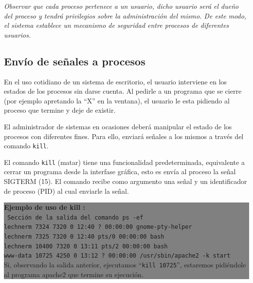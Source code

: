 \documentclass[12pt]{article}
\begin{document}
\textit{Observar que cada proceso pertenece a un usuario, dicho usuario será el 
dueño del proceso y tendrá privilegios sobre la administración del mismo. De 
este modo, el sistema establece un mecanismo de seguridad entre procesos de
diferentes usuarios.}

\subsection*{Envío de señales a procesos}

En el uso cotidiano de un sistema de escritorio, el usuario interviene 
en los estados de los procesos sin darse cuenta. Al pedirle a un programa
que se cierre (por ejemplo apretando la ``X'' en la ventana), el usuario
le esta pidiendo al proceso que termine y deje de existir. 

El administrador de sistemas en ocasiones deberá manipular el estado de 
los procesos con diferentes fines. Para ello, enviará señales a los 
mismos a través del comando \texttt{kill}. 


El comando \texttt{kill} (matar) tiene una funcionalidad predeterminada, 
equivalente a cerrar un programa desde la interfase gráfica, esto es envía
al proceso la señal SIGTERM (15). El comando 
recibe como argumento una señal y un identificador de proceso (PID) al 
cual enviarle la señal. 

\colorbox{grey}{\parbox[t]{0.95\linewidth}{ \vspace*{0.5cm} { 
{\bf Ejemplo de uso de kill :} \\
{\tt
Sección de la salida del comando \texttt{ps -ef}\\
lechnerm  7324  7320  0 12:40 ?        00:00:00 gnome-pty-helper \\
lechnerm  7325  7320  0 12:40 pts/0    00:00:00 bash\\
lechnerm 10400  7320  0 13:11 pts/2    00:00:00 bash\\
www-data 10725  4250  0 13:12 ?        00:00:00 /usr/sbin/apache2 -k start \\
}
Si, observando la salida anterior, ejecutamos ``\texttt{kill 10725}'', 
estaremos pidiéndole al programa apache2 que termine su ejecución. 
} \vspace*{0.5cm} } } 
	
\end{document}
